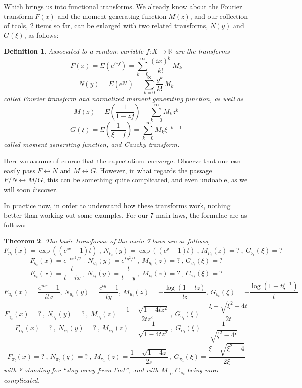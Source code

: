 \documentclass[12pt]{amsbook}
\newtheorem{theorem}{Theorem}[chapter]
\newtheorem{definition}[theorem]{Definition}
\begin{document}
Which brings us into functional transforms. We already know about the Fourier transform $F(x)$ and the moment generating function $M(z)$, and our collection of tools, 2 items so far, can be enlarged with two related transforms, $N(y)$ and $G(\xi)$, as follows:


\begin{definition}
Associated to a random variable $f:X\to\mathbb R$ are the transforms
$$F(x)=E(e^{ixf})=\sum_{k=0}^\infty\frac{(ix)^k}{k!}\,M_k$$
$$N(y)=E(e^{yf})=\sum_{k=0}^\infty\frac{y^k}{k!}\,M_k$$
called Fourier transform and normalized moment generating function, as well as
$$M(z)=E\left(\frac{1}{1-zf}\right)=\sum_{k=0}^\infty M_kz^k$$
$$G(\xi)=E\left(\frac{1}{\xi-f}\right)=\sum_{k=0}^\infty M_k\xi^{-k-1}$$
called moment generating function, and Cauchy transform.
\end{definition}

Here we assume of course that the expectations converge. Observe that one can easily pass $F\leftrightarrow N$ and $M\leftrightarrow G$. However, in what regards the passage $F/N\leftrightarrow M/G$, this can be something quite complicated, and even undoable, as we will soon discover. 

\bigskip

In practice now, in order to understand how these transforms work, nothing better than working out some examples. For our 7 main laws, the formulae are as follows:

\begin{theorem}
The basic transforms of the main 7 laws are as follows,
$$F_{p_t}(x)=\exp((e^{ix}-1)t)\ ,\ N_{p_t}(y)=\exp((e^y-1)t)\ ,\ M_{p_t}(z)=?\ ,\ G_{p_t}(\xi)=?$$
$$F_{g_t}(x)=e^{-tx^2/2}\ ,\ N_{g_t}(y)=e^{ty^2/2}\ ,\ M_{g_t}(z)=?\ ,\ G_{g_t}(\xi)=?$$
$$F_{e_t}(x)=\frac{t}{t-ix}\ ,\ N_{e_t}(y)=\frac{t}{t-y}\ ,\ M_{e_t}(z)=?\ ,\ G_{e_t}(\xi)=?$$
$$F_{u_t}(x)=\frac{e^{itx}-1}{itx},\,N_{u_t}(y)=\frac{e^{ty}-1}{ty},\,M_{u_t}(z)=-\frac{\log(1-tz)}{tz},\,G_{u_t}(\xi)=-\frac{\log(1-t\xi^{-1})}{t}$$
$$F_{\gamma_t}(x)=?\ ,\ N_{\gamma_t}(y)=?\ ,\ M_{\gamma_t}(z)=\frac{1-\sqrt{1-4tz^2}}{2tz^2}\ ,\ G_{\gamma_t}(\xi)=\frac{\xi-\sqrt{\xi^2-4t}}{2t}$$
$$F_{\alpha_t}(x)=?\ ,\ N_{\alpha_t}(y)=?\ ,\ M_{\alpha_t}(z)=\frac{1}{\sqrt{1-4tz^2}}\ ,\ G_{\alpha_t}(\xi)=\frac{1}{\sqrt{\xi^2-4t}}$$
$$F_{\pi_t}(x)=?\ ,\ N_{\pi_t}(y)=?\ ,\ M_{\pi_1}(z)=\frac{1-\sqrt{1-4z}}{2z}\ ,\ G_{\pi_1}(\xi)=\frac{\xi-\sqrt{\xi^2-4}}{2\xi}$$
with ? standing for ``stay away from that'', and with $M_{\pi_t},G_{\pi_t}$ being more complicated.
\end{theorem}
\end{document}
